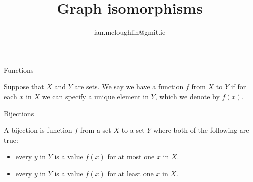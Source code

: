 \documentclass[dvipsnames, hidelinks]{beamer}
\begin{document}
  \title{Graph isomorphisms}
  \subtitle{}
  \author{ian.mcloughlin@gmit.ie}
  \date{}
 
  \begin{frame}
    \titlepage
  \end{frame}


  \begin{frame}{Functions}
  
    \begin{definition}
      Suppose that $X$ and $Y$ are sets.
      We say we have a function $f$ from $X$ to $Y$ if for each $x$ in $X$ we can specify a unique element in $Y$, which we denote by $f(x)$.
    \end{definition}
  
    \begin{center}
    \end{center}
  
  \end{frame}
  
  
  
  \begin{frame}{Bijections}
  
    \begin{definition}
      A bijection is function $f$ from a set $X$ to a set $Y$ where both of the following are true:
        \begin{itemize}
          \item every $y$ in $Y$ is a value $f(x)$ for at most one $x$ in $X$.
          \item every $y$ in $Y$ is a value $f(x)$ for at least one $x$ in  $X$.
        \end{itemize}
    \end{definition}
  
    \begin{center}
    \end{center}
  
  \end{frame}
  
\end{document}

